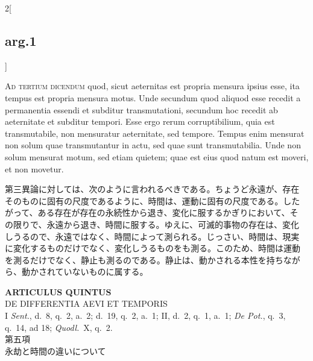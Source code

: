 \documentclass[paper=a4paper,fontsize=10pt,jafontsize=9pt,titlepage]{jlreq}
\begin{document}
\begin{paracol}{2}[\subsection{arg.1}]
\switchcolumn*[\subsection{ad.3}]

{\scshape Ad tertium dicendum} quod, sicut aeternitas est propria
mensura ipsius esse, ita tempus est propria mensura motus. Unde
secundum quod aliquod esse recedit a permanentia essendi et subditur
transmutationi, secundum hoc recedit ab aeternitate et subditur
tempori. Esse ergo rerum corruptibilium, quia est transmutabile, non
mensuratur aeternitate, sed tempore. Tempus enim mensurat non solum
quae transmutantur in actu, sed quae sunt transmutabilia. Unde non
solum mensurat motum, sed etiam quietem; quae est eius quod natum est
moveri, et non movetur.

\switchcolumn

第三異論に対しては、次のように言われるべきである。ちょうど永遠が、存在
そのものに固有の尺度であるように、時間は、運動に固有の尺度である。した
がって、ある存在が存在の永続性から退き、変化に服するかぎりにおいて、そ
の限りで、永遠から退き、時間に服する。ゆえに、可滅的事物の存在は、変化
しうるので、永遠ではなく、時間によって測られる。じっさい、時間は、現実
に変化するものだけでなく、変化しうるものをも測る。このため、時間は運動
を測るだけでなく、静止も測るのである。静止は、動かされる本性を持ちなが
ら、動かされていないものに属する。

\end{paracol}

\newpage
{}


\begin{center}
 {\Large {\bfseries ARTICULUS QUINTUS}}\\
 {\large DE DIFFERENTIA AEVI ET TEMPORIS}\\
 {\footnotesize I {\itshape Sent.}, d.~8, q.~2, a.~2; d.~19, q.~2, a.~1;
 II, d.~2, q.~1, a.~1; {\itshape De Pot.}, q.~3, q.~14, ad 18; {\itshape
 Quodl.}~X, q.~2.}\\
 {\Large 第五項\\永劫と時間の違いについて}
\end{center}


{}
\setcounter{section}{5}
\setcounter{subsection}{0}
\end{document}
